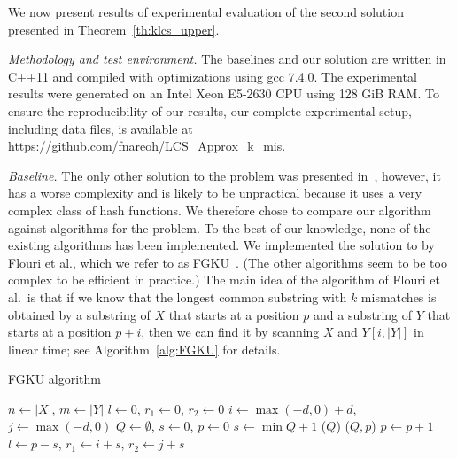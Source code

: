 We now present results of experimental evaluation of the second solution presented in Theorem~\ref{th:klcs_upper}.

\textit{Methodology and test environment.} The baselines and our solution are written in C++11 and compiled with optimizations using gcc 7.4.0. The experimental results were generated on an Intel Xeon E5-2630 CPU using 128 GiB RAM. To ensure the reproducibility of our results, our complete experimental setup, including data files, is available at \url{https://github.com/fnareoh/LCS\_Approx\_k\_mis}.

\textit{Baseline.} The only other solution to the \kApproxLCS problem was presented in~\cite{DBLP:journals/algorithmica/KociumakaRS19}, however, it has a worse complexity and is likely to be unpractical because it uses a very complex class of hash functions. We therefore chose to compare our algorithm against algorithms for the \kLCS problem. To the best of our knowledge, none of the existing algorithms has been implemented. We implemented the solution to \kLCS by Flouri et al., which we refer to as FGKU~\cite{DBLP:journals/ipl/FlouriGKU15}. (The other algorithms seem to be too complex to be efficient in practice.) The main idea of the algorithm of Flouri et al.\ is that if we know that the longest common substring with $k$ mismatches is obtained by a substring of $X$ that starts at a position $p$ and a substring of $Y$ that starts at a position $p+i$, then we can find it by scanning $X$ and $Y[i,|Y|]$ in linear time; see Algorithm~\ref{alg:FGKU} for details.

\begin{algorithm}[ht]
\caption{FGKU algorithm}
\begin{algorithmic}[1]
\State $n \gets  |X|$, $m \gets  |Y|$
\State $l \gets  0$, $r_1 \gets  0$, $r_2 \gets  0$
	\State $i \gets  \max(-d,0)+d$, $j \gets  \max(-d,0)$
	\State $Q \gets  \emptyset$, $s \gets  0$, $p \gets  0$ 
			\State $s \gets  \min Q + 1$
			($Q$)
		\EndIf
		($Q,p$)
	\EndIf
	\State $p \gets p+1$
		\State $l \gets p-s$, $r_1 \gets i+s$, $r_2 \gets j+s$
	\EndIf
	\EndWhile
\EndFor
\end{algorithmic}
\label{alg:FGKU}
\end{algorithm}

